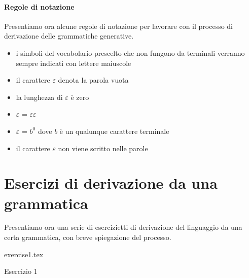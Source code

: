 \documentclass[class=book, crop=false, oneside]{standalone}
\begin{document}
\paragraph{Regole di notazione}
Presentiamo ora alcune regole di notazione per lavorare con il processo di derivazione delle grammatiche generative.
\begin{itemize}
    \item i simboli del vocabolario prescelto che non fungono da terminali verranno sempre indicati con lettere maiuscole
    \item il carattere $\varepsilon$ denota la parola vuota
    \item la lunghezza di $\varepsilon$ è zero
    \item $\varepsilon$ = $\varepsilon$$\varepsilon$
    \item $\varepsilon$ =  $b^0$ dove $b$ è un qualunque carattere terminale
    \item il carattere $\varepsilon$ non viene scritto nelle parole
\end{itemize}

\section{Esercizi di derivazione da una grammatica}
Presentiamo ora una serie di esercizietti di derivazione del linguaggio da una certa grammatica, con breve spiegazione del processo.

\begin{table}[H]\label{Esercizio 1}
	\centering
	{exercise1.tex}
    \caption{Esercizio 1}
\end{table}
\end{document}
